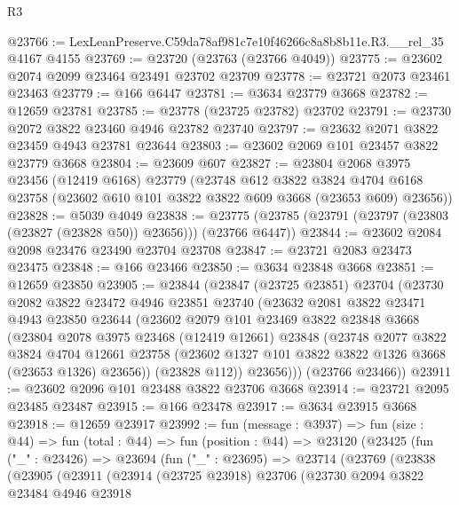 \begin{lexlean}{R3}
\begin{coremodule}
@23766 := LexLeanPreserve.C59da78af981c7e10f46266c8a8b8b11e.R3.__rel_35 @4167 @4155
@23769 := @23720 (@23763 (@23766 @4049))
@23775 := @23602 @2074 @2099 @23464 @23491 @23702 @23709
@23778 := @23721 @2073 @23461 @23463
@23779 := @166 @6447
@23781 := @3634 @23779 @3668
@23782 := @12659 @23781
@23785 := @23778 (@23725 @23782) @23702
@23791 := @23730 @2072 @3822 @23460 @4946 @23782 @23740
@23797 := @23632 @2071 @3822 @23459 @4943 @23781 @23644
@23803 := @23602 @2069 @101 @23457 @3822 @23779 @3668
@23804 := @23609 @607
@23827 := @23804
    @2068
    @3975
    @23456
    (@12419 @6168)
    @23779
    (@23748
      @612
      @3822
      @3824
      @4704
      @6168
      @23758
      (@23602 @610 @101 @3822 @3822 @609 @3668 (@23653 @609) @23656))
@23828 := @5039 @4049
@23838 := @23775 (@23785 (@23791 (@23797 (@23803 (@23827 (@23828 @50)) @23656))) (@23766 @6447))
@23844 := @23602 @2084 @2098 @23476 @23490 @23704 @23708
@23847 := @23721 @2083 @23473 @23475
@23848 := @166 @23466
@23850 := @3634 @23848 @3668
@23851 := @12659 @23850
@23905 := @23844
    (@23847
      (@23725 @23851)
      @23704
      (@23730
        @2082
        @3822
        @23472
        @4946
        @23851
        @23740
        (@23632
          @2081
          @3822
          @23471
          @4943
          @23850
          @23644
          (@23602
            @2079
            @101
            @23469
            @3822
            @23848
            @3668
            (@23804
              @2078
              @3975
              @23468
              (@12419 @12661)
              @23848
              (@23748
                @2077
                @3822
                @3824
                @4704
                @12661
                @23758
                (@23602 @1327 @101 @3822 @3822 @1326 @3668 (@23653 @1326) @23656))
              (@23828 @112))
            @23656)))
      (@23766 @23466))
@23911 := @23602 @2096 @101 @23488 @3822 @23706 @3668
@23914 := @23721 @2095 @23485 @23487
@23915 := @166 @23478
@23917 := @3634 @23915 @3668
@23918 := @12659 @23917
@23992 := fun (message : @3937) =>
  fun (size : @44) =>
  fun (total : @44) =>
  fun (position : @44) =>
  @23120
    (@23425
      (fun ("_" : @23426) =>
      @23694
        (fun ("_" : @23695) =>
        @23714
          (@23769
            (@23838
              (@23905
                (@23911
                  (@23914
                    (@23725 @23918)
                    @23706
                    (@23730
                      @2094
                      @3822
                      @23484
                      @4946
                      @23918

\end{coremodule}
\end{lexlean}
